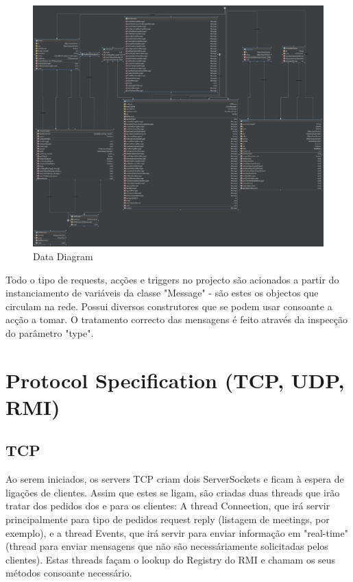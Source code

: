 \documentclass[12pt]{article} %
\begin{document}
\begin{figure}[!ht]
  	\centering
  	\includegraphics[scale=0.2]{ClassDiagram.png}
  	\caption{Data Diagram}
	\label{figure4}
\end{figure}

Todo o tipo de requests, acções e triggers no projecto são acionados a partir do instanciamento de variáveis da classe "Message" - são estes os objectos que circulam na rede. Possui diversos construtores que se podem usar consoante a acção a tomar. O tratamento correcto das mensagens é feito através da inspecção do parâmetro "type".





\section{Protocol Specification (TCP, UDP, RMI)} %
\label{sec:protocal_specs}

\subsection{TCP}

Ao serem iniciados, os servers TCP criam dois ServerSockets e ficam à espera de ligações de clientes. Assim que estes se ligam, são criadas duas threads que irão tratar dos pedidos dos e para os clientes: A thread Connection, que irá servir principalmente para tipo de pedidos request reply (listagem de meetings, por exemplo), e a thread Events, que irá servir para enviar informação em "real-time" (thread para enviar mensagens que não são necessáriamente solicitadas pelos clientes). Estas threads façam o lookup do Registry do RMI e chamam os seus métodos consoante necessário.
\end{document}
